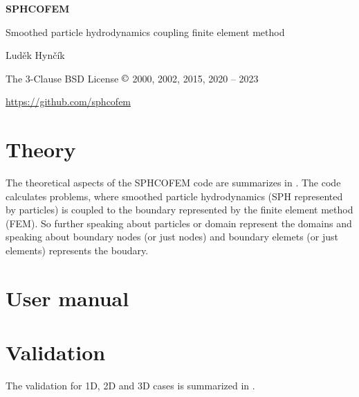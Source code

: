 \documentclass[12pt]{article}
\begin{document}

{\bf SPHCOFEM}

Smoothed particle hydrodynamics coupling finite element method

Lud\v{e}k Hyn\v{c}\'{i}k

The 3-Clause BSD License $\copyright$ 2000, 2002, 2015, 2020 -- 2023

\href{https://github.com/sphcofem}{https://github.com/sphcofem}

\newpage

\tableofcontents
\newpage


\section{Theory}

The theoretical aspects of the SPHCOFEM code are summarizes in \cite{Hyncik:2002a, Hyncik:2002b, Hyncik:2015a, Hyncik:2015b, Hyncik:2022}. The code calculates problems, where smoothed particle hydrodynamics (SPH represented by particles) is coupled to the boundary represented by the finite element method (FEM). So further speaking about particles or domain represent the domains and speaking about boundary nodes (or just nodes) and boundary elemets (or just elements) represents the boudary.

\newpage


\section{User manual}




\newpage




\newpage




\newpage


\section{Validation}


The validation for 1D, 2D and 3D cases is summarized in \cite{Hyncik:2002a, Hyncik:2002b, Hyncik:2015a, Hyncik:2015b}.

\newpage


 


\end{document}
